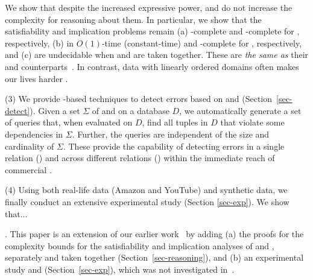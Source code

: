 We show that despite the increased expressive power,
\pCFDs and \pCINDs do not increase the complexity for
reasoning about them. In particular, we show that
the satisfiability and implication problems remain
(a) \NP-complete and \coNP-complete for \pCFDs, respectively,
(b) in $O(1)$-time (constant-time) and \EXPTIME-complete
for \pCINDs, respectively,
and (c) are undecidable when \pCFDs and \pCINDs are taken together.
These are {\em the same as} their \CFDs and \CINDs counterparts~\cite{tcs-CINDs}.
In contrast, data with linearly ordered domains often makes our lives harder \cite{Mayden97}.


\sstab
\noindent(3) We provide \SQL-based techniques to detect errors
based on \pCFDs and \pCINDs (Section~\ref{sec-detect}). Given a set $\Sigma$ of {\pCFDs}
and \pCINDs on a database $D$, we automatically generate
a set of \SQL queries that, when evaluated on $D$, find all tuples in $D$ that
violate some dependencies in $\Sigma$. Further,
the \SQL queries are independent of the size and cardinality
of $\Sigma$.
These provide the capability of detecting errors in a single
relation (\pCFDs) and across different relations (\pCINDs)
within the immediate reach of commercial \rdms.


\sstab
\noindent(4) Using both real-life data (Amazon and YouTube) and synthetic data, we finally conduct
an extensive experimental study (Section \ref{sec-exp}). We show that...



. This paper is an extension of our earlier work~\cite{dexaChenFM09} by adding  %
(a) the proofs for the complexity bounds for the satisfiability and
implication analyses of \pCFDs and \pCINDs, separately and taken together (Section~\ref{sec-reasoning}), and
(b) an experimental study \pCFDs and \pCINDs (Section~\ref{sec-exp}), which was not investigated in~\cite{dexaChenFM09}.



